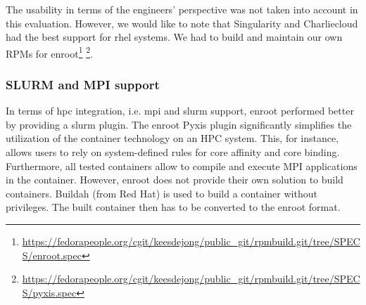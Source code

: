 \documentclass[12pt]{article}
\begin{document}
    The usability in terms of the engineers' perspective was not taken into account in this evaluation. However, we would like to note that Singularity and Charliecloud had the best support for \gls{rhel} systems. We had to build and maintain our own RPMs for enroot\footnote{\url{https://fedorapeople.org/cgit/keesdejong/public_git/rpmbuild.git/tree/SPECS/enroot.spec}} \footnote{\url{https://fedorapeople.org/cgit/keesdejong/public_git/rpmbuild.git/tree/SPECS/pyxis.spec}}.
    
    \subsubsection{SLURM and MPI support}
    In terms of \gls{hpc} integration, i.e. \gls{mpi} and \gls{slurm} support, enroot performed better by providing a \gls{slurm} plugin. The enroot Pyxis plugin significantly simplifies the utilization of the container technology on an HPC system. This, for instance, allows users to rely on system-defined rules for core affinity and core binding. Furthermore, all tested containers allow to compile and execute MPI applications in the container. However, enroot does not provide their own solution to build containers. Buildah (from Red Hat) is used to build a container without privileges. The built container then has to be converted to the enroot format.
    



    
\end{document}
